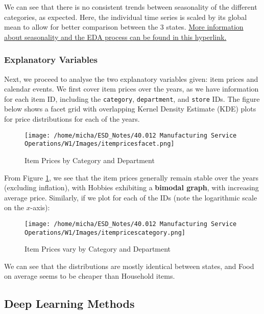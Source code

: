 \documentclass[12pt]{article}
\begin{document}
\noindent We can see that there is no consistent trends between seasonality of the different categories, as expected. Here, the individual time series is scaled by its global mean to allow for better comparison between the 3 states. \href{https://www.kaggle.com/code/headsortails/back-to-predict-the-future-interactive-m5-eda/report}{More information about seasonality and the EDA process can be found in this hyperlink.}

\subsubsection*{Explanatory Variables}

Next, we proceed to analyse the two explanatory variables given: item prices and calendar events. We first cover item prices over the years, as we have information for each item ID, including the \verb|category|, \verb|department|, and \verb|store| IDs. The figure below shows a facet grid with overlapping Kernel Density Estimate (KDE) plots for price distributions for each of the years.

\begin{figure}[H]
    \centering
    \texttt{[image: /home/micha/ESD\_Notes/40.012 Manufacturing Service Operations/W1/Images/itempricesfacet.png]}
    \caption{Item Prices by Category and Department}
    \label{fig:6-itemprices}
\end{figure} 

\noindent From Figure \ref{fig:6-itemprices}, we see that the item prices generally remain stable over the years (excluding inflation), with Hobbies exhibiting a \textbf{bimodal graph}, with increasing average price. Similarly, if we plot for each of the IDs (note the logarithmic scale on the $x$-axis):

\begin{figure}[H]
    \centering
    \texttt{[image: /home/micha/ESD\_Notes/40.012 Manufacturing Service Operations/W1/Images/itempricescategory.png]}
    \caption{Item Prices vary by Category and Department}
    \label{fig:6-itempricescategory}
\end{figure} 

\noindent We can see that the distributions are mostly identical between states, and Food on average seems to be cheaper than Household items. 

\subsection*{Deep Learning Methods}
\end{document}
